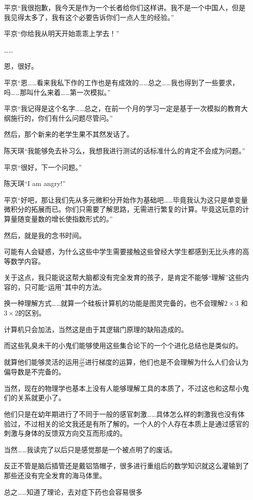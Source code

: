 平京“我很抱歉，我今天是作为一个长者给你们这样讲。我不是一个中国人，但是我见得太多了，我有这个必要告诉你们一点人生的经验。”

平京“你给我从明天开始乖乖上学去！”

……

恩，很好。

平京“恩……看来我私下作的工作也是有成效的……总之……我也得到了一些要求，吗……那叫什么来着……第一次模拟。”

平京“我记得是这个名字……总之，在前一个月的学习一定是基于一次模拟的教育大纲施行的，你们有什么问题尽管问。”

然后，那个新来的老学生果不其然发话了。

陈天琪“我能够免去补习么，我想我进行测试的话标准什么的肯定不会成为问题。”

平京“很好，下一个问题。”

陈天琪“I am angry!”
 
平京“好吧，那让我们先从多元微积分开始作为基础吧……毕竟我认为这只是单变量微积分的拓展而已。你们只需要了解思路，无需进行繁复的计算。毕竟这玩意的计算量随变量数的增长使指数形式的。”

然后，就是我的念书时间。

可能有人会疑惑，为什么这些中学生需要接触这些曾经大学生都感到无比头疼的高等数学内容。

关于这点，我只能说这帮大脑都没有完全发育的孩子，是肯定不能够“理解”这些内容的，只可能“运用”其中的方法。

换一种理解方式……就算一个硅板计算机的功能是图灵完备的，也不会理解$2\times 3$ 和 $3\times 2 $的区别。

计算机只会加法，当然这是由于其逻辑门原理的缺陷造成的。

而这些乳臭未干的小鬼们能够使用这些集合论下的一个个进化总结也是类似的。

就算他们能够灵活的运用$\frac{\partial f}{\partial x}$进行梯度的运算，他们也是不会理解为什么人们会认为偏导数是不完备的。

当然，现在的物理学也基本上没有人能够理解工具的本质了，不过这也和这帮小鬼们的关系就更小了。

他们只是在幼年期进行了不同于一般的感官刺激……具体怎么样的刺激我也没有体验过，不过相关的论文我还是有所了解的。一个人的个人存在本质上是通过感官的刺激与身体的反馈双方向交互而形成的。

当然……我读完了以后只是感觉那是一个被点明了的废话。

反正不管是脑后插管还是戴铝箔帽子，很多进行重组后的数学知识就这么灌输到了那些还没有完全发育的海马体里。

总之……知道了理论，去对症下药也会容易很多

